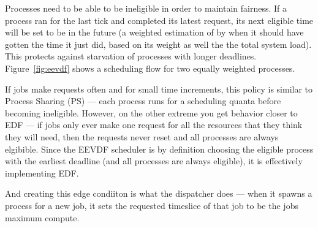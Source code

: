 Processes need to be able to be ineligible in order to maintain fairness. If a
process ran for the last tick and completed its latest request, its next
eligible time will be set to be in the future (a weighted estimation of by when
it should have gotten the time it just did, based on its weight as well the the
total system load). This protects against starvation of processes with longer
deadlines. Figure~\ref{fig:eevdf} shows a scheduling flow for two equally weighted
processes.

If jobs make requests often and for small time increments, this policy is
similar to Process Sharing (PS) --- each process runs for a scheduling quanta
before becoming ineligible. However, on the other extreme you get behavior
closer to EDF --- if jobs only ever make one request for all the resources that
they think they will need, then the requests never reset and all processes are
always elgibible. Since the EEVDF scheduler is by definition choosing the
eligible process with the earliest deadline (and all processes are always
eligible), it is effectively implementing EDF.

And creating this edge condiiton is what the dispatcher does --- when it spawns
a process for a new job, it sets the requested timeslice of that job to be the
jobs maximum compute. 

